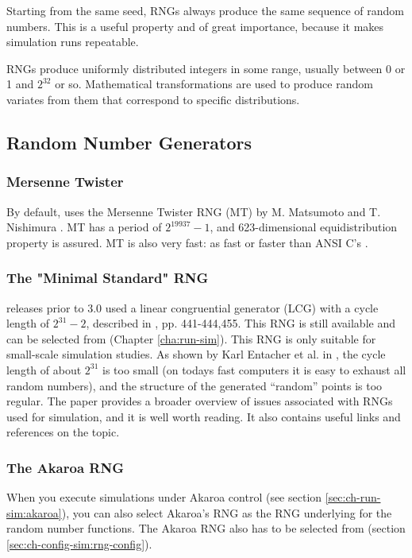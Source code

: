 Starting from the same seed, RNGs always produce the same sequence
of random numbers. This is a useful property and of great importance,
because it makes simulation runs repeatable.

RNGs produce uniformly distributed integers in some range,
usually between 0 or 1 and $2^{32}$ or so. Mathematical transformations
are used to produce random variates from them that correspond to
specific distributions.

\subsection{Random Number Generators}
\label{sec:sim-lib:rngs}

\subsubsection{Mersenne Twister}

By default, {\opp} uses the Mersenne Twister RNG (MT) by M. Matsumoto and
T. Nishimura \cite{Matsumoto98}. MT has a period of $2^{19937}-1$,
and 623-dimensional equidistribution property is assured. MT is
also very fast: as fast or faster than ANSI C's .

\subsubsection{The "Minimal Standard" RNG}

{\opp} releases prior to 3.0 used a linear congruential generator
(LCG) with a cycle length of $2^{31}-2$, described in
\cite{Jain91}, pp. 441-444,455. This RNG is still available
and can be selected from  (Chapter \ref{cha:run-sim}).
This RNG is only suitable for small-scale simulation studies.
As shown by Karl Entacher et al. in \cite{Entacher02},
the cycle length of about $2^{31}$ is too small (on todays
fast computers it is easy to exhaust all random numbers), and
the structure of the generated ``random'' points is too regular.
The \cite{Hellekalek98} paper provides a broader overview of issues
associated with RNGs used for simulation, and it is well worth reading.
It also contains useful links and references on the topic.

\subsubsection{The Akaroa RNG}

When you execute simulations under Akaroa control (see section
\ref{sec:ch-run-sim:akaroa}), you can also select Akaroa's
RNG as the RNG underlying for the {\opp} random number functions.
The Akaroa RNG also has to be selected from 
(section \ref{sec:ch-config-sim:rng-config}).

